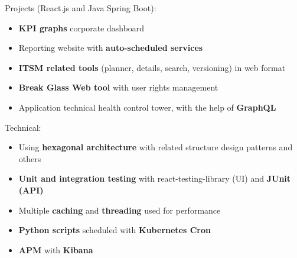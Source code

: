 \documentclass[10pt,a4paper,ragged2e,withhyper]{altacv}
\begin{document}


\makecvheader


\vspace{-.5\baselineskip}
\begin{minipage}[t]{0.45\textwidth}
  \vspace{0pt}
Projects (React.js and Java Spring Boot):
  \begin{itemize}
  \item \textbf{KPI graphs} corporate dashboard
  \item Reporting website with \textbf{auto-scheduled services}
  \item \textbf{ITSM related tools} (planner, details, search, versioning) in web format
  \item \textbf{Break Glass Web tool} with user rights management
  \item Application technical health control tower, with the help of \textbf{GraphQL}
\end{itemize}
\end{minipage}
\hfill
\begin{minipage}[t]{0.45\textwidth}
  \vspace{0pt}
  Technical:
  \begin{itemize}
    \item Using \textbf{hexagonal architecture} with related structure design patterns and others
    \item \textbf{Unit and integration testing} with react-testing-library (UI) and \textbf{JUnit (API)}
    \item Multiple \textbf{caching} and \textbf{threading} used for performance
    \item \textbf{Python scripts} scheduled with \textbf{Kubernetes Cron}
    \item \textbf{APM} with \textbf{Kibana}
  \end{itemize}
\end{minipage}
\end{document}
